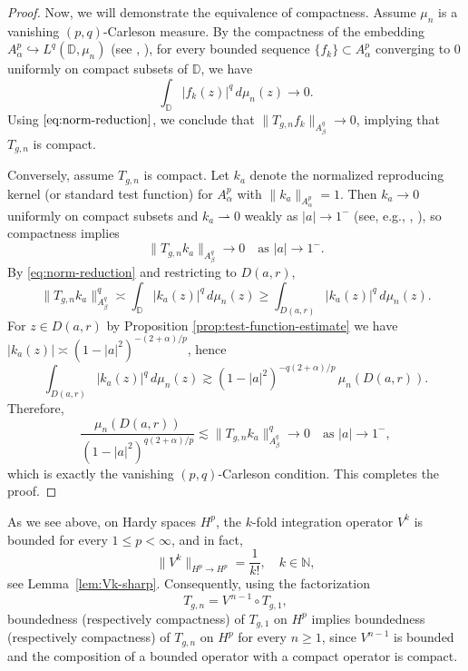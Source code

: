 \documentclass[preprint,12pt]{elsarticle}
\numberwithin{equation}{section}
\theoremstyle{remark}
\begin{document}
\begin{proof}
Now, we will demonstrate the equivalence of compactness.
Assume $ \mu_n $ is a vanishing $(p,q)$-Carleson measure. By the compactness of the embedding $ A_\alpha^p \hookrightarrow L^q(\mathbb D, \mu_n) $ (see \cite{Dya}, \cite[Ch. 2]{Zhu2005}), for every bounded sequence $ \{f_k\} \subset A_\alpha^p $ converging to $ 0 $ uniformly on compact subsets of $ \mathbb{D} $, we have
\begin{equation*}
\int_{\mathbb{D}} |f_k(z)|^q \, d\mu_n(z) \to 0.
\end{equation*}
Using $\eqref{eq:norm-reduction}$, we conclude that $ \|T_{g,n}f_k\|_{A_\beta^q} \to 0 $, implying that $ T_{g,n} $ is compact.

Conversely, assume $T_{g,n}$ is compact. Let $k_a$ denote the normalized reproducing kernel (or standard test function)
for $A_\alpha^p$ with $\|k_a\|_{A_\alpha^p}=1$. Then $k_a\to 0$ uniformly on compact subsets and $k_a\rightharpoonup 0$
weakly as $|a|\to 1^-$ (see, e.g., \cite{Hedenmalm},  \cite[Ch. 2]{Zhu2005}), so compactness implies
\begin{equation*}
\|T_{g,n}k_a\|_{A_\beta^q}\longrightarrow 0 \quad \text{as } |a|\to 1^-.
\end{equation*}
By \eqref{eq:norm-reduction} and restricting to $D(a,r)$,
\begin{equation*}
\|T_{g,n}k_a\|_{A_\beta^q}^q
\asymp \int_{\mathbb D}|k_a(z)|^q\,d\mu_n(z)
\ge \int_{D(a,r)}|k_a(z)|^q\,d\mu_n(z).
\end{equation*}
For $z\in D(a,r)$ by Proposition \ref{prop:test-function-estimate} we have $|k_a(z)|\asymp (1-|a|^2)^{-(2+\alpha)/p}$, hence
\begin{equation*}
\int_{D(a,r)}|k_a(z)|^q\,d\mu_n(z)
\gtrsim (1-|a|^2)^{-q(2+\alpha)/p}\,\mu_n(D(a,r)).
\end{equation*}
Therefore,
\begin{equation*}
\frac{\mu_n(D(a,r))}{(1-|a|^2)^{q(2+\alpha)/p}}
\lesssim \|T_{g,n}k_a\|_{A_\beta^q}^q \longrightarrow 0 \quad \text{as } |a|\to 1^-,
\end{equation*}
which is exactly the vanishing $(p,q)$-Carleson condition. This completes the proof.
\end{proof}


As we see above, on Hardy spaces $H^p$, the $k$-fold integration operator $V^k$ is bounded for every
$1\le p<\infty$, and in fact,
\begin{equation*}
\|V^k\|_{H^p\to H^p}=\frac{1}{k!},\quad k\in\mathbb N,
\end{equation*}
see Lemma~\ref{lem:Vk-sharp}. Consequently, using the factorization
\begin{equation*}
T_{g,n}=V^{\,n-1}\circ T_{g,1},
\end{equation*}
boundedness (respectively compactness) of $T_{g,1}$ on $H^p$ implies boundedness
(respectively compactness) of $T_{g,n}$ on $H^p$ for every $n\ge1$, since $V^{n-1}$ is
bounded and the composition of a bounded operator with a compact operator is compact.
\end{document}
